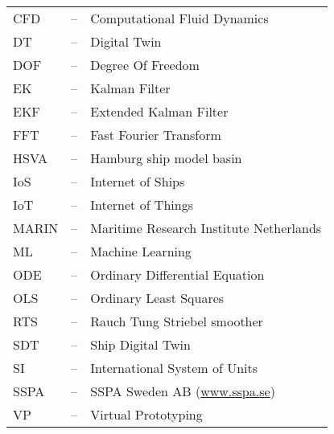 
\begin{tabular}{ l c l }
CFD & -- & Computational Fluid Dynamics\\
DT  & -- & Digital Twin\\
DOF & -- & Degree Of Freedom\\
EK & -- & Kalman Filter \\
EKF & -- & Extended Kalman Filter \\
FFT & -- & Fast Fourier Transform\\
HSVA & -- & Hamburg ship model basin \\
IoS & -- & Internet of Ships \\
IoT & -- & Internet of Things \\
MARIN & -- & Maritime Research Institute Netherlands \\
ML & -- & Machine Learning \\
ODE & -- & Ordinary Differential Equation\\
OLS & -- & Ordinary Least Squares\\
RTS & -- & Rauch Tung Striebel smoother \\
SDT  & -- & Ship Digital Twin\\
SI  & -- & International System of Units\\
SSPA & -- & SSPA Sweden AB (\url{www.sspa.se})\\
VP & -- & Virtual Prototyping \\
\end{tabular}
